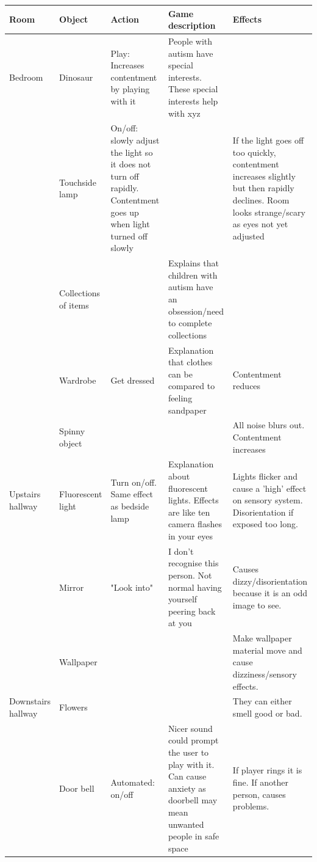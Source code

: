 \documentclass[11pt]{report}
\begin{document}
\begin{table}[H]
    \begin{tabular}{| p{2cm} | p{2cm} | p{3cm} | p{3cm} | p{4cm} |}
    \hline
    Room & Object & Action & Game description & Effects                                                                  \\
    \hline
    \hline
     Bedroom & Dinosaur & Play: Increases contentment by playing with it & People with autism have special interests. These special interests help with xyz &                   \\
    \hline
    & Touchside lamp & On/off: slowly adjust the light so it does not turn off rapidly. Contentment goes up when light turned off slowly & & If the light goes off too quickly, contentment increases slightly but then rapidly declines. Room looks strange/scary as eyes not yet adjusted    \\
    \hline
    & Collections of items & & Explains that children with autism have an obsession/need to complete collections &  \\
    \hline
    & Wardrobe & Get dressed & Explanation that clothes can be compared to feeling sandpaper & Contentment reduces  \\
    \hline
   & Spinny object & & & All noise blurs out. Contentment increases \\
    \hline 
    Upstairs hallway & Fluorescent light & Turn on/off. Same effect as bedside lamp & Explanation about fluorescent lights. Effects are like ten camera flashes in your eyes & Lights flicker and cause a 'high' effect on sensory system. Disorientation if exposed too long. \\
    \hline
    & Mirror & "Look into" & I don't recognise this person. Not normal having yourself peering back at you & Causes dizzy/disorientation because it is an odd image to see. \\
    \hline
    & Wallpaper & & & Make wallpaper material move and cause dizziness/sensory effects. \\
    \hline
        Downstairs hallway & Flowers & & & They can either smell good or bad. \\
    \hline
    & Door bell & Automated: on/off & Nicer sound could prompt the user to play with it. Can cause anxiety as doorbell may mean unwanted people in safe space & If player rings it is fine. If another person, causes problems.
    \\
    \hline
    \end{tabular}
\end{table}
\end{document}
